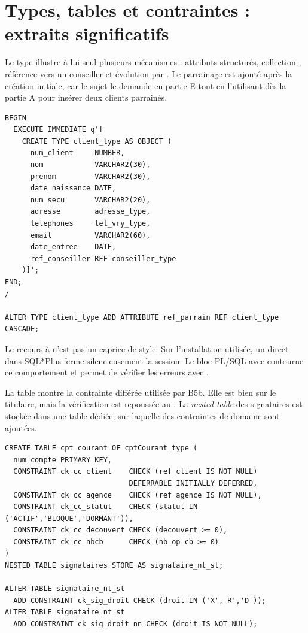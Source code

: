 \section{Types, tables et contraintes : extraits significatifs}

Le type  illustre à lui seul plusieurs mécanismes : attributs
structurés, collection , référence vers un conseiller et évolution
par . Le parrainage est ajouté après la création initiale, car
le sujet le demande en partie E tout en l'utilisant dès la partie A pour
insérer deux clients parrainés.

\begin{lstlisting}[caption={Création de \code{client\_type} et ajout du parrainage.},label={lst:client-type}]
BEGIN
  EXECUTE IMMEDIATE q'[
    CREATE TYPE client_type AS OBJECT (
      num_client     NUMBER,
      nom            VARCHAR2(30),
      prenom         VARCHAR2(30),
      date_naissance DATE,
      num_secu       VARCHAR2(20),
      adresse        adresse_type,
      telephones     tel_vry_type,
      email          VARCHAR2(60),
      date_entree    DATE,
      ref_conseiller REF conseiller_type
    )]';
END;
/

ALTER TYPE client_type ADD ATTRIBUTE ref_parrain REF client_type CASCADE;
\end{lstlisting}

Le recours à  n'est pas un caprice de style. Sur
l'installation utilisée, un  direct dans SQL*Plus ferme
silencieusement la session. Le bloc PL/SQL avec  contourne ce
comportement et permet de vérifier les erreurs avec .

La table  montre la contrainte différée utilisée par B5b.
Elle est bien  sur le titulaire, mais la vérification est
repoussée au . La \emph{nested table} des signataires est stockée
dans une table dédiée, sur laquelle des contraintes de domaine sont ajoutées.

\begin{lstlisting}[caption={Table \code{cpt\_courant} et stockage des signataires.},label={lst:cpt-courant}]
CREATE TABLE cpt_courant OF cptCourant_type (
  num_compte PRIMARY KEY,
  CONSTRAINT ck_cc_client    CHECK (ref_client IS NOT NULL)
                             DEFERRABLE INITIALLY DEFERRED,
  CONSTRAINT ck_cc_agence    CHECK (ref_agence IS NOT NULL),
  CONSTRAINT ck_cc_statut    CHECK (statut IN ('ACTIF','BLOQUE','DORMANT')),
  CONSTRAINT ck_cc_decouvert CHECK (decouvert >= 0),
  CONSTRAINT ck_cc_nbcb      CHECK (nb_op_cb >= 0)
)
NESTED TABLE signataires STORE AS signataire_nt_st;

ALTER TABLE signataire_nt_st
  ADD CONSTRAINT ck_sig_droit CHECK (droit IN ('X','R','D'));
ALTER TABLE signataire_nt_st
  ADD CONSTRAINT ck_sig_droit_nn CHECK (droit IS NOT NULL);
\end{lstlisting}

